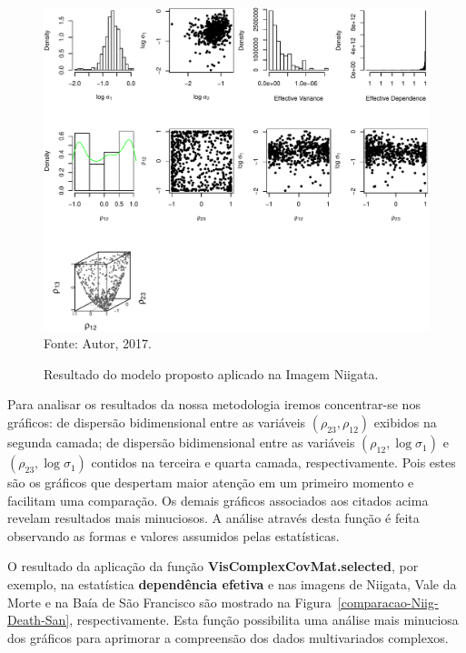 \documentclass[a4paper,12pt]{article}
\begin{document}
\begin{figure}[h]
\centering
\caption{Resultado do modelo proposto aplicado na Imagem Niigata.}
\includegraphics[width=\linewidth]{../../Figuras/Amostras-Niigata/Niigata-Amarela-500.pdf}\\
Fonte: Autor, 2017.
\label{grafico-geral}
\end{figure}  

Para analisar os resultados da nossa metodologia iremos concentrar-se nos gráficos: de dispersão bidimensional entre as variáveis $(\rho_{23}, \rho_{12})$ exibidos na segunda camada; de dispersão bidimensional entre as variáveis $(\rho_{12},\log\sigma_{1})$ e $(\rho_{23},\log\sigma_{1})$ contidos na terceira e quarta camada, respectivamente. Pois estes são os gráficos que despertam maior atenção em um primeiro momento e facilitam uma comparação. Os demais gráficos associados aos citados acima revelam resultados mais minuciosos. A análise através desta função é feita observando as formas e valores assumidos pelas estatísticas.   

O resultado da aplicação da função \textbf{VisComplexCovMat.selected}, por exemplo, na estatística \textbf{dependência efetiva} e nas imagens de Niigata, Vale da Morte e na Baía de São Francisco são mostrado na Figura~\ref{comparacao-Niig-Death-San}, respectivamente. Esta função possibilita uma análise mais minuciosa dos gráficos para aprimorar a compreensão dos dados multivariados complexos.  

\newpage
\end{document}
